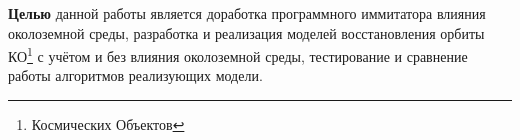 {\textbf{Целью} данной работы является доработка программного иммитатора влияния околоземной среды, разработка и
реализация моделей восстановления орбиты КО\footnote{Космических Объектов} с учётом и без влияния околоземной 
среды, тестирование и сравнение работы алгоритмов реализующих модели.

}

\clearpage